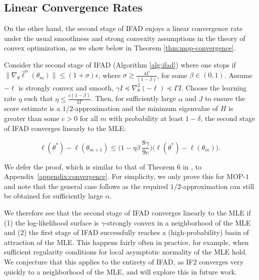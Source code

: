 \documentclass[11pt]{article}
\newcommand\arxiv[2]{#1} %
\begin{document}
\subsection{Linear Convergence Rates}

On the other hand, the second stage of IFAD enjoys a linear convergence rate under the usual smoothness and strong convexity assumptions in the theory of convex optimization, as we show below in Theorem \ref{thm:mop-convergence}.

\begin{thm}
    
Consider the second stage of IFAD (Algorithm \ref{alg:ifad}) where one stops if $\|\nabla_\theta \hat\ell^\alpha(\theta_m)\| \leq (1+\sigma) \epsilon$, where $\sigma \geq \frac{4 \Gamma}{(1-\beta)}$, for some $\beta \in (0,1)$. Assume $-\ell$ is strongly convex and smooth, $\gamma I \preceq \nabla_\theta^2 (-\ell) \preceq \Gamma I$. Choose the learning rate $\eta$ such that $\eta \leq \frac{c(1-\beta)}{2\Gamma}$. Then, for sufficiently large $\alpha$ and $J$ to ensure the score estimate is a $1/2$-approximation and the minimum eigenvalue of $H$ is greater than some $c > 0$ for all $m$ with probability at least $1-\delta$, the second stage of IFAD converges linearly to the MLE:
\arxiv{}{\vspace*{-2mm}}
$$
\ell(\theta^*) - \ell(\theta_{m+1}) \leq \Big(1-\eta\beta\, \frac{8\gamma}{9c}\Big)\big(\ell(\theta^*)-\ell(\theta_m)\big).
$$
\label{thm:mop-convergence}
\end{thm}
\arxiv{}{\vspace*{-5mm}}
We defer the proof, which is similar to that of Theorem 6 in \cite{mahoney16}, to \arxiv{Appendix~\ref{appendix:convergence}}{the supplementary information}. For simplicity, we only prove this for MOP-$1$ and note that the general case follows as the required $1/2$-approximation can still be obtained for sufficiently large $\alpha$. 

We therefore see that the second stage of IFAD converges linearly to the MLE if (1) the log-likelihood surface is $\gamma$-strongly convex in a neighborhood of the MLE and (2) the first stage of IFAD successfully reaches a (high-probability) basin of attraction of the MLE. This happens fairly often in practice, for example, when sufficient regularity conditions for local asymptotic normality of the MLE hold. We conjecture that this applies to the entirety of IFAD, as IF2 converges very quickly to a neighborhood of the MLE, and will explore this in future work.
\end{document}

